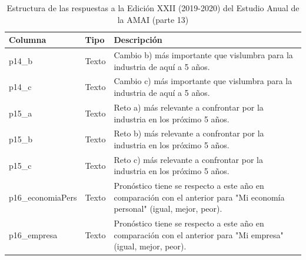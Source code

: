 \begin{table}[]
\caption{Estructura de las respuestas a la Edición XXII (2019-2020) del Estudio Anual de la AMAI (parte 13)}
\label{tab:raw2019_13}
\begin{tabular}{|l|l|l|}
\hline
Columna &
  Tipo &
  Descripción \\ \hline
p14\_b & Texto & \parbox[t]{8cm}{Cambio b) más importante que vislumbra para la industria de aquí a 5 años. \vspace{0.1cm}} \\ \hline
p14\_c & Texto & \parbox[t]{8cm}{Cambio c) más importante que vislumbra para la industria de aquí a 5 años. \vspace{0.1cm}} \\ \hline
p15\_a & Texto & \parbox[t]{8cm}{Reto a) más relevante a confrontar por la industria en los próximo 5 años. \vspace{0.1cm}}  \\ \hline
p15\_b & Texto & \parbox[t]{8cm}{Reto b) más relevante a confrontar por la industria en los próximo 5 años. \vspace{0.1cm}}  \\ \hline
p15\_c & Texto & \parbox[t]{8cm}{Reto c) más relevante a confrontar por la industria en los próximo 5 años. \vspace{0.1cm}}  \\ \hline
p16\_economiaPers & Texto & \parbox[t]{8cm}{Pronóstico tiene se respecto a este año en comparación con el anterior para "Mi economía personal" (igual, mejor, peor). \vspace{0.1cm}} \\ \hline
p16\_empresa      & Texto & \parbox[t]{8cm}{Pronóstico tiene se respecto a este año en comparación con el anterior para "Mi empresa" (igual, mejor, peor). \vspace{0.1cm}}  \\ \hline
\end{tabular}
\end{table}

\newpage

